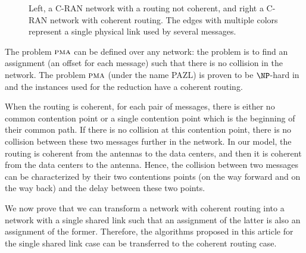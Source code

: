 \documentclass[a4paper,UKenglish,cleveref, autoref, thm-restate]{lipics-v2019}
\newcommand\pma{\textsc{pma}\xspace}
\begin{document}
\begin{figure}
\begin{center}
\begin{minipage}[c]{.45\linewidth}
{
}



\end{minipage}

 \caption{Left, a C-RAN network with a routing not coherent, and right a C-RAN network with coherent routing. The edges with multiple colors represent a single physical link used by several messages.}

\label{fig:coherent}
\end{center}
\end{figure}


The problem $\pma$ can be defined over any network: the problem is to find an assignment (an offset for each message) such that there is no collision in the network.
The problem $\pma$ (under the name \textsc{PAZL}) is proven to be $\NP$-hard in~\cite{bartharxiv2018deterministic} and the instances used for the reduction have a coherent routing. 

When the routing is coherent, for each pair of messages, there is either no common contention point or a single contention point which is the beginning of their common path. If there is no collision at this contention point, there is no collision between these two messages further in the network.
In our model, the routing is coherent from the antennas to the data centers, and then it is coherent from the data centers to the antenna. Hence, the collision between two messages can be characterized by their two contentions points (on the way forward and on the way back) and the delay between these two points. 

We now prove that we can transform a network with coherent routing into a network with a single shared link such that an assignment of the latter is also an assignment of the former. Therefore, the algorithms proposed in this article for the single shared link case can be transferred to the coherent routing case. 
\end{document}
